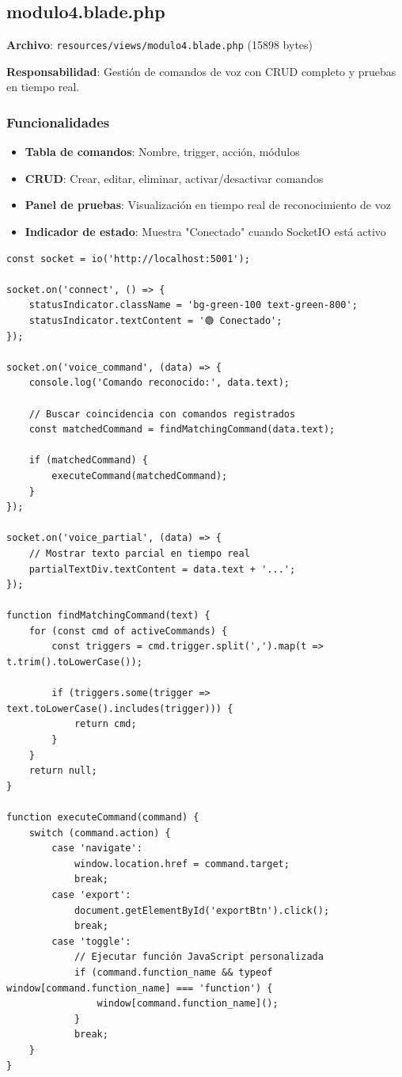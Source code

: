 \documentclass[12pt,a4paper]{article}
\begin{document}
\subsection{modulo4.blade.php}

\textbf{Archivo}: \texttt{resources/views/modulo4.blade.php} (15898 bytes)

\textbf{Responsabilidad}: Gestión de comandos de voz con CRUD completo y pruebas en tiempo real.

\subsubsection{Funcionalidades}

\begin{itemize}
    \item \textbf{Tabla de comandos}: Nombre, trigger, acción, módulos
    \item \textbf{CRUD}: Crear, editar, eliminar, activar/desactivar comandos
    \item \textbf{Panel de pruebas}: Visualización en tiempo real de reconocimiento de voz
    \item \textbf{Indicador de estado}: Muestra "Conectado" cuando SocketIO está activo
\end{itemize}

\begin{lstlisting}[caption={modulo4 - Integración SocketIO}, style=jsstyle, label=lst:modulo4-socketio]
const socket = io('http://localhost:5001');

socket.on('connect', () => {
    statusIndicator.className = 'bg-green-100 text-green-800';
    statusIndicator.textContent = '🟢 Conectado';
});

socket.on('voice_command', (data) => {
    console.log('Comando reconocido:', data.text);
    
    // Buscar coincidencia con comandos registrados
    const matchedCommand = findMatchingCommand(data.text);
    
    if (matchedCommand) {
        executeCommand(matchedCommand);
    }
});

socket.on('voice_partial', (data) => {
    // Mostrar texto parcial en tiempo real
    partialTextDiv.textContent = data.text + '...';
});

function findMatchingCommand(text) {
    for (const cmd of activeCommands) {
        const triggers = cmd.trigger.split(',').map(t => t.trim().toLowerCase());
        
        if (triggers.some(trigger => text.toLowerCase().includes(trigger))) {
            return cmd;
        }
    }
    return null;
}

function executeCommand(command) {
    switch (command.action) {
        case 'navigate':
            window.location.href = command.target;
            break;
        case 'export':
            document.getElementById('exportBtn').click();
            break;
        case 'toggle':
            // Ejecutar función JavaScript personalizada
            if (command.function_name && typeof window[command.function_name] === 'function') {
                window[command.function_name]();
            }
            break;
    }
}
\end{lstlisting}
\end{document}
